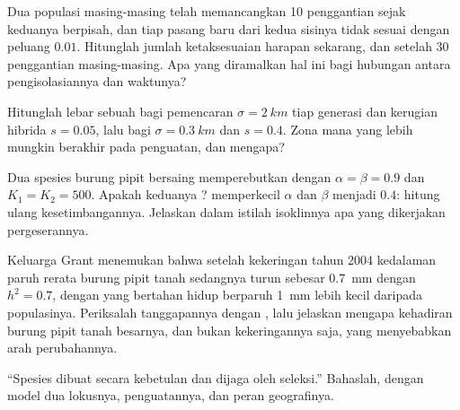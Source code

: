 \begin{exercise}[$\star\star$]\label{exo:b2:speciation:8}
Dua populasi masing-masing telah memancangkan 10 penggantian sejak
keduanya berpisah, dan tiap pasang  baru dari kedua sisinya tidak
sesuai dengan peluang $0.01$. Hitunglah jumlah ketaksesuaian harapan
sekarang, dan setelah 30 penggantian masing-masing. Apa yang diramalkan
hal ini bagi hubungan antara pengisolasiannya dan waktunya?
\end{exercise}

\begin{exercise}[$\star\star$]\label{exo:b2:speciation:9}
Hitunglah lebar sebuah  bagi pemencaran $\sigma =
\qty{2}{km}$ tiap generasi dan kerugian hibrida $s = 0.05$, lalu bagi
$\sigma = \qty{0.3}{km}$ dan $s = 0.4$. Zona mana yang lebih mungkin
berakhir pada penguatan, dan mengapa?
\end{exercise}

\begin{exercise}[$\star\star\star$]\label{exo:b2:speciation:10}
Dua spesies burung pipit bersaing memperebutkan  dengan
$\alpha = \beta = 0.9$ dan $K_1 = K_2 = 500$. Apakah keduanya ?
 memperkecil $\alpha$ dan $\beta$ menjadi $0.4$: hitung
ulang kesetimbangannya. Jelaskan dalam istilah isoklinnya apa yang
dikerjakan pergeserannya.
\end{exercise}

\begin{exercise}[$\star\star\star$]\label{exo:b2:speciation:11}
Keluarga Grant menemukan bahwa setelah kekeringan tahun 2004 kedalaman
paruh rerata burung pipit tanah sedangnya turun sebesar \qty{0.7}{mm}
dengan $h^{2} = 0.7$, dengan yang bertahan hidup berparuh \qty{1}{mm}
lebih kecil daripada populasinya. Periksalah tanggapannya dengan
, lalu jelaskan mengapa kehadiran burung pipit tanah
besarnya, dan bukan kekeringannya saja, yang menyebabkan arah
perubahannya.
\end{exercise}

\begin{exercise}[$\star\star\star$]\label{exo:b2:speciation:12}
``Spesies dibuat secara kebetulan dan dijaga oleh seleksi.'' Bahaslah,
dengan model dua lokusnya, penguatannya, dan peran geografinya.
\end{exercise}

